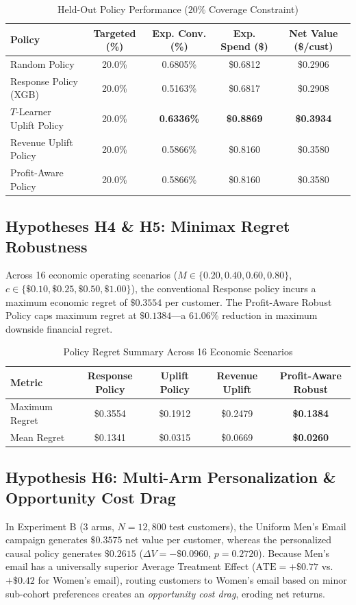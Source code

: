 \documentclass[11pt,a4paper]{article}
\begin{document}
\begin{table}[h]
\centering
\small
\caption{Held-Out Policy Performance ($20\%$ Coverage Constraint)}
\label{tab:policy}
\begin{tabular}{lcccc}
\toprule
Policy & Targeted (\%) & Exp. Conv. (\%) & Exp. Spend (\$) & Net Value (\$/cust) \\
\midrule
Random Policy & 20.0\% & 0.6805\% & \$0.6812 & \$0.2906 \\
Response Policy (XGB) & 20.0\% & 0.5163\% & \$0.6817 & \$0.2908 \\
$T$-Learner Uplift Policy & 20.0\% & \textbf{0.6336\%} & \textbf{\$0.8869} & \textbf{\$0.3934} \\
Revenue Uplift Policy & 20.0\% & 0.5866\% & \$0.8160 & \$0.3580 \\
Profit-Aware Policy & 20.0\% & 0.5866\% & \$0.8160 & \$0.3580 \\
\bottomrule
\end{tabular}
\end{table}

\subsection{Hypotheses H4 \& H5: Minimax Regret Robustness}
Across 16 economic operating scenarios ($M \in \{0.20, 0.40, 0.60, 0.80\}$, $c \in \{\$0.10, \$0.25, \$0.50, \$1.00\}$), the conventional Response policy incurs a maximum economic regret of $\$0.3554$ per customer. The Profit-Aware Robust Policy caps maximum regret at $\$0.1384$---a $61.06\%$ reduction in maximum downside financial regret.

\begin{table}[h]
\centering
\small
\caption{Policy Regret Summary Across 16 Economic Scenarios}
\label{tab:regret}
\begin{tabular}{lcccc}
\toprule
Metric & Response Policy & Uplift Policy & Revenue Uplift & Profit-Aware Robust \\
\midrule
Maximum Regret & \$0.3554 & \$0.1912 & \$0.2479 & \textbf{\$0.1384} \\
Mean Regret & \$0.1341 & \$0.0315 & \$0.0669 & \textbf{\$0.0260} \\
\bottomrule
\end{tabular}
\end{table}

\subsection{Hypothesis H6: Multi-Arm Personalization \& Opportunity Cost Drag}
In Experiment B ($3$ arms, $N = 12,800$ test customers), the Uniform Men's Email campaign generates $\$0.3575$ net value per customer, whereas the personalized causal policy generates $\$0.2615$ ($\Delta V = -\$0.0960$, $p = 0.2720$). Because Men's email has a universally superior Average Treatment Effect ($\text{ATE} = +\$0.77$ vs. $+\$0.42$ for Women's email), routing customers to Women's email based on minor sub-cohort preferences creates an \textit{opportunity cost drag}, eroding net returns.
\end{document}
